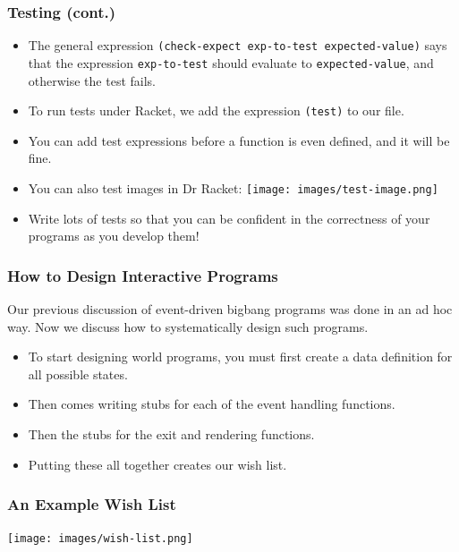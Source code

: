 \documentclass{beamer}
\begin{document}
\begin{frame}
  \frametitle{Testing (cont.)}
  \begin{itemize}
  \item  The general expression \texttt{(check-expect exp-to-test expected-value)} says that the expression \texttt{exp-to-test}
    should evaluate to \texttt{expected-value}, and otherwise the test fails.
  \item<2-> To run tests under Racket, we add the expression \texttt{(test)} to our file.
  \item<3-> You can add test expressions before a function is even defined, and it will be fine.
  \item<4-> You can also test images in Dr Racket:
    \texttt{[image: images/test-image.png]}
  \item<5-> Write lots of tests so that you can be confident in the correctness of your programs as you develop them!
  \end{itemize}
\end{frame}

\begin{frame}
  \frametitle{How to Design Interactive Programs}
  Our previous discussion of event-driven bigbang programs was done in an ad hoc way. Now we discuss how to systematically design such programs.
  \begin{itemize}
  \item<2-> To start designing world programs, you must first create a data definition for all possible states.
  \item<3-> Then comes writing stubs for each of the event handling functions.
  \item<4-> Then the stubs for the exit and rendering functions.
  \item<5-> Putting these all together creates our wish list.
  \end{itemize}
\end{frame}

\begin{frame}
  \frametitle{An Example Wish List}
  \begin{center}
    \texttt{[image: images/wish-list.png]}
  \end{center}
\end{frame}

\end{document}
